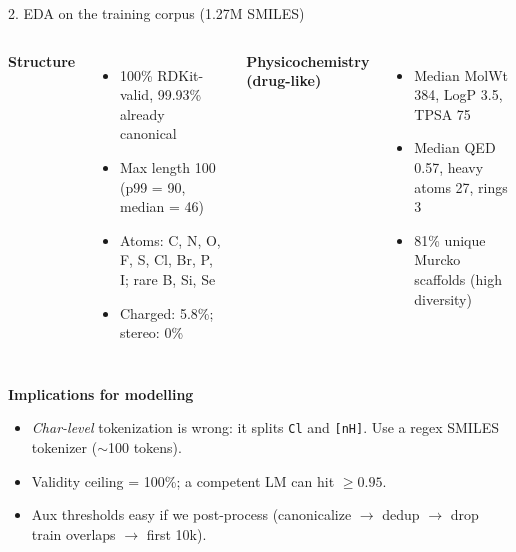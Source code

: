 \documentclass[aspectratio=169,11pt]{beamer}
\begin{document}
\begin{frame}{2. EDA on the training corpus (1.27M SMILES)}
  \begin{columns}[T,onlytextwidth]
    \textbf{Structure}
    \begin{itemize}
      \item 100\% RDKit-valid, 99.93\% already canonical
      \item Max length 100 (p99 = 90, median = 46)
      \item Atoms: C, N, O, F, S, Cl, Br, P, I; rare B, Si, Se
      \item Charged: 5.8\%; stereo: 0\%
    \end{itemize}

    \textbf{Physicochemistry (drug-like)}
    \begin{itemize}
      \item Median MolWt 384, LogP 3.5, TPSA 75
      \item Median QED 0.57, heavy atoms 27, rings 3
      \item 81\% unique Murcko scaffolds (high diversity)
    \end{itemize}
  \end{columns}

  \vspace{0.5em}
  \textbf{Implications for modelling}
  \begin{itemize}
    \item \emph{Char-level} tokenization is wrong: it splits \texttt{Cl} and
      \texttt{[nH]}. Use a regex SMILES tokenizer ($\sim$100 tokens).
    \item Validity ceiling = 100\%; a competent LM can hit $\geq 0.95$.
    \item Aux thresholds easy if we post-process
      (canonicalize $\to$ dedup $\to$ drop train overlaps $\to$ first 10k).
  \end{itemize}
\end{frame}
\end{document}
